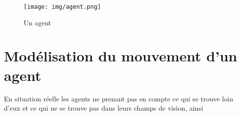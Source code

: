 \documentclass{article}
\begin{document}
\begin{figure}[h]
  \texttt{[image: img/agent.png]}
  \caption{Un agent}
  \label{fig:agent}
\end{figure}


\section{Modélisation du mouvement d'un agent}

En situation réelle les agents ne prenant pas en compte ce qui se trouve
loin d'eux et ce qui
ne se trouve pas dans leurs champs de vision, ainsi 
\end{document}
